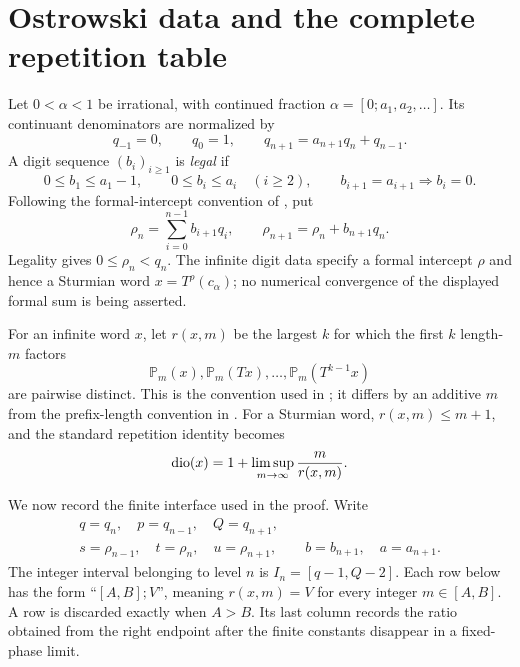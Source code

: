 \section{Ostrowski data and the complete repetition table}
\label{sec:repetition}

Let $0<\alpha<1$ be irrational, with continued fraction
$\alpha=[0;a_1,a_2,\ldots]$.  Its continuant denominators are normalized by
\begin{equation}
  q_{-1}=0,
  \qquad q_0=1,
  \qquad q_{n+1}=a_{n+1}q_n+q_{n-1}.
  \label{eq:continuants}
\end{equation}
A digit sequence $(b_i)_{i\geq1}$ is \emph{legal} if
\begin{equation}
  0\leq b_1\leq a_1-1,
  \qquad
  0\leq b_i\leq a_i\quad(i\geq2),
  \qquad
  b_{i+1}=a_{i+1}\Longrightarrow b_i=0.
  \label{eq:legality}
\end{equation}
Following the formal-intercept convention of \cite[Section~2]{Wojcik2025v1},
put
\begin{equation}
  \rho_n=\sum_{i=0}^{n-1}b_{i+1}q_i,
  \qquad
  \rho_{n+1}=\rho_n+b_{n+1}q_n.
  \label{eq:rho-recurrence}
\end{equation}
Legality gives $0\leq\rho_n<q_n$.  The infinite digit data specify a formal
intercept $\rho$ and hence a Sturmian word $x=T^\rho(c_\alpha)$; no numerical
convergence of the displayed formal sum is being asserted.

For an infinite word $x$, let $r(x,m)$ be the largest $k$ for which the first
$k$ length-$m$ factors
\[
  \mathbb P_m(x),\mathbb P_m(Tx),\ldots,
  \mathbb P_m(T^{k-1}x)
\]
are pairwise distinct.  This is the convention used in
\cite[Definition~1.1.2]{Wojcik2025v1}; it differs by an additive $m$ from the
prefix-length convention in \cite{BugeaudKim2019}.  For a Sturmian word,
$r(x,m)\leq m+1$, and the standard repetition identity becomes
\begin{equation}
  \operatorname{dio}(x)=1+\limsup_{m\to\infty}\frac{m}{r(x,m)}.
  \label{eq:dio-repetition}
\end{equation}

We now record the finite interface used in the proof.  Write
\begin{equation}
\begin{gathered}
 q=q_n,\quad p=q_{n-1},\quad Q=q_{n+1},\\
 s=\rho_{n-1},\quad t=\rho_n,\quad u=\rho_{n+1},
 \qquad b=b_{n+1},\quad a=a_{n+1}.
\end{gathered}
\label{eq:table-shorthand}
\end{equation}
The integer interval belonging to level $n$ is
$I_n=[q-1,Q-2]$.  Each row below has the form
``$[A,B];V$'', meaning $r(x,m)=V$ for every integer $m\in[A,B]$.
A row is discarded exactly when $A>B$.  Its last column records the ratio
obtained from the right endpoint after the finite constants disappear in a
fixed-phase limit.

